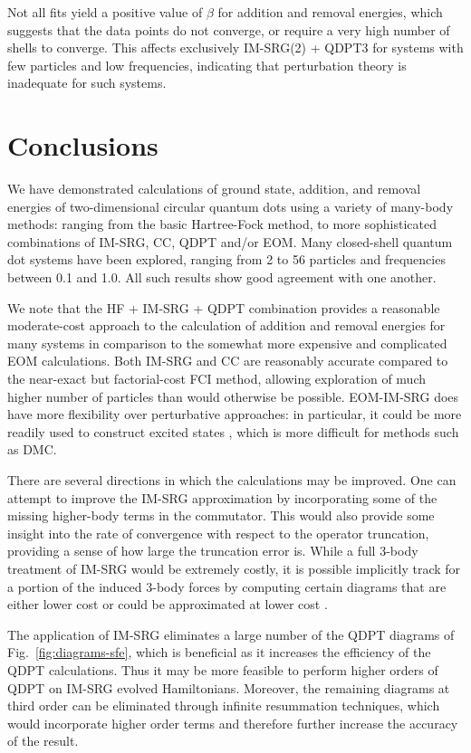 Not all fits yield a positive value of $\beta$ for addition and
removal energies, which suggests that the data points do not converge,
or require a very high number of shells to converge.  This affects
exclusively IM-SRG(2) + QDPT3 for systems with few particles and low
frequencies, indicating that perturbation theory is inadequate for
such systems.

\section{Conclusions}
\label{sec:conclusions}

We have demonstrated calculations of ground state, addition, and
removal energies of two-dimensional circular quantum dots using a
variety of many-body methods: ranging from the basic Hartree-Fock
method, to more sophisticated combinations of IM-SRG, CC, QDPT and/or
EOM.  Many closed-shell quantum dot systems have been explored,
ranging from 2 to 56 particles and frequencies between 0.1 and 1.0.
All such results show good agreement with one another.

We note that the HF + IM-SRG + QDPT combination provides a reasonable
moderate-cost approach to the calculation of addition and removal
energies for many systems in comparison to the somewhat more expensive
and complicated EOM calculations.  Both IM-SRG and CC are reasonably
accurate compared to the near-exact but factorial-cost FCI method,
allowing exploration of much higher number of particles than would
otherwise be possible.  EOM-IM-SRG does have more flexibility over
perturbative approaches: in particular, it could be more readily used
to construct excited states \cite{2016arXiv161100661P}, which is more
difficult for methods such as DMC.

There are several directions in which the calculations may be
improved.  One can attempt to improve the IM-SRG approximation by
incorporating some of the missing higher-body terms in the commutator.
This would also provide some insight into the rate of convergence with
respect to the operator truncation, providing a sense of how large the
truncation error is.  While a full 3-body treatment of IM-SRG would be
extremely costly, it is possible implicitly track for a portion of the
induced 3-body forces by computing certain diagrams that are either
lower cost or could be approximated at lower cost \cite{IMSRG}.

The application of IM-SRG eliminates a large number of the QDPT
diagrams of Fig.\ \ref{fig:diagrams-sfe}, which is beneficial as it
increases the efficiency of the QDPT calculations.  Thus it may be
more feasible to perform higher orders of QDPT on IM-SRG evolved
Hamiltonians.  Moreover, the remaining diagrams at third order can be
eliminated through infinite resummation techniques, which would
incorporate higher order terms and therefore further increase the
accuracy of the result.

